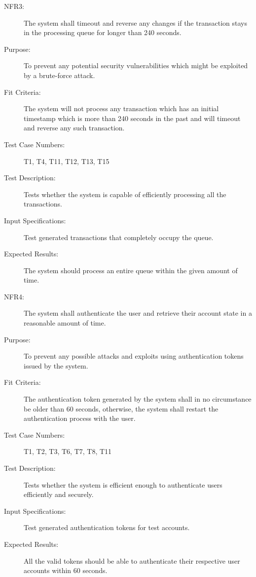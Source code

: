 \documentclass[a4paper,twoside,phd]{BYUPhys}
\begin{document}
\begin{description}
\item[NFR3:] The system shall timeout and reverse any changes if the transaction stays in the processing queue for longer than 240 seconds.
\item[Purpose:] To prevent any potential security vulnerabilities which might be exploited by a brute-force attack.
\item[Fit Criteria:] The system will not process any transaction which has an initial timestamp which is more than 240 seconds in the past and will timeout and reverse any such transaction.
\item[Test Case Numbers:] T1, T4, T11, T12, T13, T15
\item[Test Description:] Tests whether the system is capable of efficiently processing all the transactions.
\item[Input Specifications:] Test generated transactions that completely occupy the queue.
\item[Expected Results:] The system should process an entire queue within the given amount of time.

\item[NFR4:] The system shall authenticate the user and retrieve their account state in a reasonable amount of time.
\item[Purpose:] To prevent any possible attacks and exploits using authentication tokens issued by the system.
\item[Fit Criteria:] The authentication token generated by the system shall in no circumstance be older than 60 seconds, otherwise, the system shall restart the authentication process with the user.
\item[Test Case Numbers:] T1, T2, T3, T6, T7, T8, T11
\item[Test Description:] Tests whether the system is efficient enough to authenticate users efficiently and securely.
\item[Input Specifications:] Test generated authentication tokens for test accounts.
\item[Expected Results:] All the valid tokens should be able to authenticate their respective user accounts within 60 seconds.


\end{description}
\end{document}
